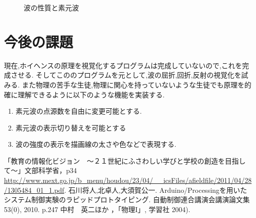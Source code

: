 \documentclass[a4j,twocolumn,uplatex]{jarticle}
\begin{document}
\begin{figure}[htbp]
\caption{{\footnotesize 波の性質と素元波 }}
\label{fig:thomson2clausius}
\end{figure}
\vspace{-7mm}

\section{今後の課題}
現在,ホイヘンスの原理を視覚化するプログラムは完成していないので,これを完成させる.
そしてこののプログラムを元として,波の屈折,回折,反射の視覚化を試みる.
また物理の苦手な生徒,物理に関心を持っていないような生徒でも原理を的確に理解できるように以下のような機能を実装する.
\begin{enumerate}
\item 素元波の点源数を自由に変更可能とする.
\item 素元波の表示切り替えを可能とする
\item 波の強度の表示を描画線の太さや色などで表現する.
\end{enumerate}

\vspace{-5mm}
\begin{thebibliography}{9}
「教育の情報化ビジョン　〜２１世紀にふさわしい学びと学校の創造を目指して〜」文部科学省，p34 \url{http://www.mext.go.jp/b_menu/houdou/23/04/__icsFiles/afieldfile/2011/04/28/1305484_01_1.pdf}.
 石川将人,北卓人,大須賀公一. Arduino/Processingを用いたシステム制御実験のラピッドプロトタイピング. 自動制御連合講演会講演論文集 53(0), 2010. p.247 
 中村　英二ほか ，「物理I」, 学習社 2004).


\end{thebibliography}
\end{document}

